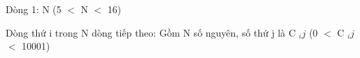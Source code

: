 Dòng 1: N (5 $<$ N $<$ 16)  

   Dòng thứ i trong N dòng tiếp theo: Gồm N số nguyên, số thứ j là C   $_    ij   $   (0 $<$ C   $_    ij   $   $<$ 10001)  

\